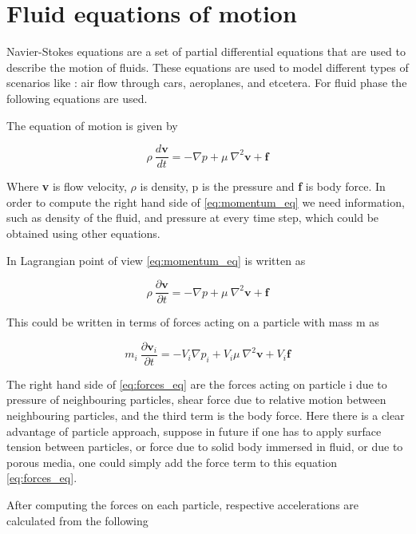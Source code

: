\section{Fluid equations of motion}

Navier-Stokes equations are a set of partial differential equations
that are used to describe the motion of fluids. These equations are
used to model different types of scenarios like : air flow through
cars, aeroplanes, and etcetera.  For fluid phase the following
equations are used.

The equation of motion is given by


\begin{equation}
  \label{eq:momentum_eq}
  \rho \>\frac{d\textbf{v}}{dt} = - \nabla p + \mu\> \nabla^2\textbf{v} + \textbf{f}
\end{equation}

Where \textbf{v} is flow velocity, $\rho$ is density, p is the
pressure and \textbf{f} is body force. In order to compute the right
hand side of \eqref{eq:momentum_eq} we need information, such as
density of the fluid, and pressure at every time step, which could be
obtained using other equations.


In Lagrangian point of view  \eqref{eq:momentum_eq} is written as

\begin{equation}
  \label{eq:momentum_eq}
  \rho \>\frac{\partial\textbf{v}}{\partial t} = - \nabla p + \mu\> \nabla^2\textbf{v} + \textbf{f}
\end{equation}

This could be written in terms of forces acting on a particle with mass m as

\begin{equation*}
  \label{eq:forces_eq}
  m_i \>\frac{\partial\textbf{v}_i}{\partial t} = -V_i \nabla p_i + V_i \mu\> \nabla^2\textbf{v} + V_i \textbf{f}
\end{equation*}

The right hand side of \eqref{eq:forces_eq} are the forces acting on
particle i due to pressure of neighbouring particles, shear force due
to relative motion between neighbouring particles, and the third term
is the body force. Here there is a clear advantage of particle approach,
suppose in future if one has to apply surface tension between particles,
or force due to solid body immersed in fluid, or due to porous media,
one could simply add the force term to this equation \eqref{eq:forces_eq}.


After computing the forces on each particle, respective accelerations are calculated
from the following

